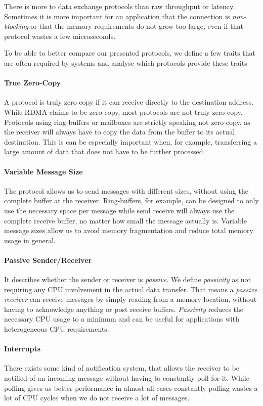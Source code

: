 There is more to data exchange protocols than raw throughput or latency. Sometimes it is more important for an application
that the connection is \emph{non-blocking} or that the memory requirements do not grow too large, even if that protocol wastes
a few microseconds.

To be able to better compare our presented protocols, we define a few traits that are often required by systems and
analyse which protocols provide these traits

\paragraph{True Zero-Copy} A protocol is truly zero copy if it can receive directly to the destination address. While RDMA 
claims to be zero-copy, most protocols are not truly zero-copy. Protocols using ring-buffers or mailboxes are
strictly speaking not zero-copy, as the receiver will always have to copy the data from the buffer to its actual destination.
This is can be especially important when, for example, transferring a large amount of data that does not have to be further processed.

\paragraph{Variable Message Size} The protocol allows us to send messages with different sizes, without using the 
complete buffer at the receiver. Ring-buffers, for example, can be designed to only use the necessary space per message
while send receive will always use the complete receive buffer, no matter how small the message actually is. Variable
message sizes allow us to avoid memory fragmentation and reduce total memory usage in general.

\paragraph{Passive Sender/Receiver} It describes whether the sender or receiver is \emph{passive}. We define \emph{passivity} as not 
requiring any CPU involvement in the actual data transfer. That means a \emph{passive receiver} can receive messages by
simply reading from a memory location, without having to acknowledge anything or post receive buffers. \emph{Passivity} 
reduces the necessary CPU usage to a minimum and can be useful for applications with heterogeneous CPU requirements.

\paragraph{Interrupts} There exists some kind of notification system, that allows the receiver to be notified 
of an incoming message without having to constantly poll for it. While polling gives us better performance in almost all cases
constantly polling wastes a lot of CPU cycles when we do not receive a lot of messages.

